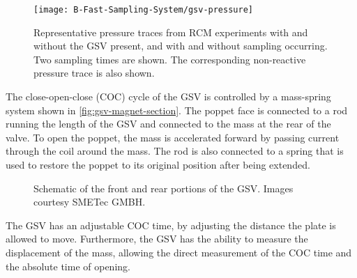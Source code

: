 \documentclass[../main.tex]{subfiles}
\begin{document}
\begin{figure}
\texttt{[image: B-Fast-Sampling-System/gsv-pressure]}
\caption{Representative pressure traces from RCM experiments with and
without the GSV present, and with and without sampling occurring. Two
sampling times are shown. The corresponding non-reactive pressure trace
is also shown.}
\label{fig:gsv-pressure}
\end{figure}

The close-open-close (COC) cycle of the GSV is controlled by a mass-spring
system shown in \cref{fig:gsv-magnet-section}. The poppet face is connected
to a rod running the length of the
GSV and connected to the mass at the rear of the valve. To open the poppet,
the mass is accelerated forward by passing current through the coil around
the mass. The rod is also
connected to a spring that is used to restore the poppet to its original
position after being extended.

\begin{figure}
        {\caption{Schematic of the front and rear portions of the GSV. Images courtesy
        SMETec GMBH.}
        \label{fig:gsv-schematic}}
\end{figure}

The GSV has an adjustable COC time, by adjusting the
distance the plate is allowed to move. Furthermore, the GSV has the ability
to measure the displacement of the mass, allowing the direct measurement of
the COC time and the absolute time of opening.
\end{document}
